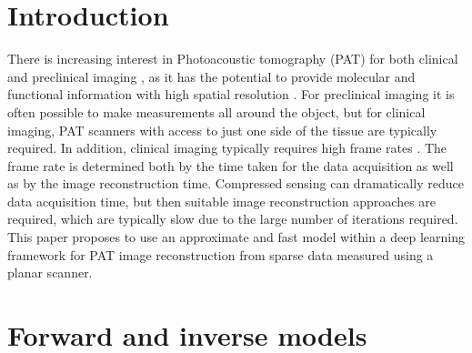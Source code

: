 \documentclass[runningheads]{llncs}
\begin{document}
\section{Introduction}
There is increasing interest in Photoacoustic tomography (PAT) for both clinical and preclinical imaging \cite{Upputuri2016}, as it has the potential to provide molecular and functional information with high spatial resolution \cite{Beard:2011if}. For preclinical imaging it is often possible to make measurements all around the object, but for clinical imaging, PAT scanners with access to just one side of the tissue are typically required. In addition, clinical imaging typically requires high frame rates \cite{Choi2018}.  The frame rate is determined both by the time taken for the data acquisition as well as by the image reconstruction time. Compressed sensing can dramatically reduce data acquisition time, but then suitable image reconstruction approaches are required, which are typically slow due to the large number of iterations required. This paper proposes to use an approximate and fast model within a deep learning framework for PAT image reconstruction from sparse data measured using a planar scanner.

\vspace{-0.5em}

\section{Forward and inverse models}
\end{document}
